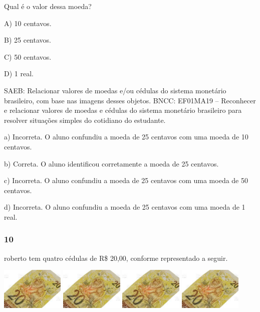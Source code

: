 \begin{itemize}
\begin{itemize}
Qual é o valor dessa moeda?

A) 10 centavos.

B) 25 centavos.

C) 50 centavos.

D) 1 real.

SAEB: Relacionar valores de moedas e/ou cédulas do sistema
monetário brasileiro, com base nas imagens desses objetos.
BNCC: EF01MA19 -- Reconhecer e relacionar valores de moedas e cédulas do
sistema monetário brasileiro para resolver situações simples do
cotidiano do estudante.

a) Incorreta. O aluno confundiu a moeda de 25 centavos com uma moeda de
10 centavos.

b) Correta. O aluno identificou corretamente a moeda de 25 centavos.

c) Incorreta. O aluno confundiu a moeda de 25 centavos com uma moeda de
50 centavos.

d) Incorreta. O aluno confundiu a moeda de 25 centavos com uma moeda de
1 real.

\subsubsection{10}\label{section-126}

roberto tem quatro cédulas de R\$ 20,00, conforme representado a seguir.

\includegraphics[width=1.18253in,height=0.78643in]{media/image108.jpg}
\includegraphics[width=1.18253in,height=0.78643in]{media/image108.jpg}
\includegraphics[width=1.18253in,height=0.78643in]{media/image108.jpg}
\includegraphics[width=1.18253in,height=0.78643in]{media/image108.jpg}


\end{itemize}
\end{itemize}
